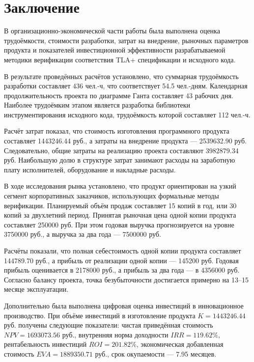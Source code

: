 \section{Заключение}

В организационно-экономической части работы была выполнена оценка
трудоёмкости, стоимости разработки, затрат на внедрение, рыночных
параметров продукта и показателей инвестиционной эффективности
разрабатываемой методики верификации соответствия TLA+ спецификации и
исходного кода.

В результате проведённых расчётов установлено, что суммарная
трудоёмкость разработки составляет 436 чел.-ч, что соответствует
54.5 чел.-дням. Календарная продолжительность проекта по диаграмме
Ганта составляет 43 рабочих дня. Наиболее трудоёмким этапом является
разработка библиотеки инструментирования исходного кода, трудоёмкость
которой составляет 112 чел.-ч.

Расчёт затрат показал, что стоимость изготовления программного
продукта составляет 1443246.44 руб., а затраты на внедрение продукта
--- 2539632.90 руб. Следовательно, общие затраты на реализацию проекта
составляют 3982879.34 руб. Наибольшую долю в структуре затрат занимают
расходы на заработную плату исполнителей, оборудование и накладные
расходы.

В ходе исследования рынка установлено, что продукт ориентирован на
узкий сегмент корпоративных заказчиков, использующих формальные методы
верификации. Планируемый объём продаж составляет 15 копий в год, или
30 копий за двухлетний период. Принятая рыночная цена одной копии
продукта составляет 250000 руб. При этом годовая выручка прогнозируется
на уровне 3750000 руб., а выручка за два года --- 7500000 руб.

Расчёты показали, что полная себестоимость одной копии продукта
составляет 144789.70 руб., а прибыль от реализации одной копии ---
145200 руб. Годовая прибыль оценивается в 2178000 руб., а прибыль за
два года --- в 4356000 руб. Согласно балансу проекта, точка
безубыточности достигается примерно на 13--15 месяце эксплуатации.

Дополнительно была выполнена цифровая оценка инвестиций в инновационное
производство. При объёме инвестиций в изготовление продукта
$K = 1443246.44$ руб. получены следующие показатели: чистая приведённая
стоимость $NPV = 1693073.56$ руб., внутренняя норма доходности
$IRR = 119.62\%$, рентабельность инвестиций $ROI = 201.82\%$,
экономическая добавленная стоимость $EVA = 1889350.71$ руб., срок
окупаемости --- 7.95 месяцев.

